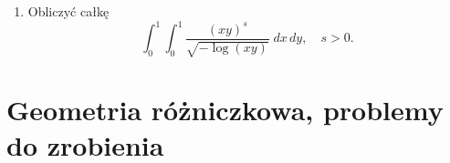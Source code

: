 \documentclass[a4paper,11pt]{article}
\begin{document}




\begin{enumerate}

\item Obliczyć całkę
  \begin{equation}
    \label{eq:Calculus-01}
    \int_{ 0 }^{ 1 } \int_{ 0 }^{ 1 } \frac{ ( x y )^{ s } }{ \sqrt{-\log( x y ) } }
      \; dx \, dy, \quad
      s > 0.
  \end{equation}



\end{enumerate}










\section{Geometria różniczkowa, problemy do zrobienia}


\end{document}

